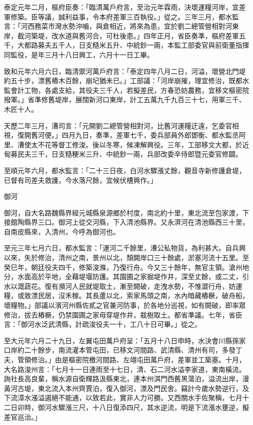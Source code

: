 \begin{pinyinscope}
 泰定元年二月，樞府臣奏：「臨清萬戶府言，至治元年霖雨，決壞運糧河岸，宜差軍修築。臣等議，誠利益事，令本府差軍三百執役。」從之。三年三月，都水監言：「河西務菜市灣水勢沖嚙，與倉相近，將來為患，宜於劉二總管營相對河東岸，截河築堤，改水道與舊河合，可杜後患。」四年正月，省臣奏準，樞府差軍五千，大都路募夫五千人，日支糙米五升、中統鈔一兩，本監工部委官與前衛董指揮同監役，是年三月十八日興工，六月十一日工畢。



 致和元年六月六日，臨清禦河萬戶府言：「泰定四年八月二日，河溢，壞營北門堤約五十步，漂舊樁木百餘，崩圮猶未已。」工部議：「河岸崩摧，理宜修治，既都水監會計工物，各處支給，其役夫三千人，若擬差民，方春恐妨農務，宜移文樞密院撥軍。」省準修舊堤岸，展闊新河口東岸，計工五萬九千九百三十七，用軍三千、木匠十人。



 天歷二年三月，漕司言：「元開劉二總管營相對河，比舊河運糧迂遠，乞委官相視，復開舊河便。」四月九日，奏準，差軍七千，委兵部員外郎鄧衡、都水監丞阿里、漕使太不花等督工修浚。後以冬寒，候凍解興役。三年，工部移文大都，於近甸募民夫三千，日支糙粳米三升、中統鈔一兩，兵部改委辛侍郎暨元委官修闢。



 至順元年六月，都水監言：「二十三日夜，白河水驟漲丈餘，觀音寺新修護倉堤，已督有司差夫救護，今水落尺餘，宜候伏槽興作。」



 御河



 御河，自大名路魏縣界經元城縣泉源鄉於村度，南北約十里，東北流至包家渡，下接館陶縣界三口。御河上從交河縣，下入清池縣界。又永濟河在清池縣西三十里，自南皮縣來，入清州，今呼為御河也。



 至元三年七月六日，都水監言：「運河二千餘里，漕公私物貨，為利甚大。自兵興以來，失於修治，清州之南，景州以北，頹闕岸口三十餘處，淤塞河流十五里。至癸巳年，朝廷役夫四千，修築浚滌，乃復行舟。今又三十餘年，無官主領。滄州地分，水面高於平地，全藉堤堰防護。其園圃之家掘堤作井，深至丈餘，或二丈，引水以溉蔬花。復有瀕河人民就堤取土，漸至闕破，走洩水勢，不惟澀行舟，妨運糧，或致漂民居，沒禾稼。其長蘆以北，索家馬頭之南，水內暗藏樁橛，破舟船，壞糧物。」部議以濱河州縣佐貳之官兼河防事，於各地分巡視，如有闕破，即率眾修治，拔去樁橛，仍禁園圃之家毋穿堤作井，栽樹取土。都省準議。七年，省臣言：「御河水泛武清縣，計疏浚役夫一十，工八十日可畢。」從之。



 至大元年六月二十九日，左翼屯田萬戶府呈：「五月十八日申時，水決會川縣孫家口岸約二十餘步，南流灌本管屯田，已移文河間路、武清縣、清州有司，多發丁夫，管領修治。」由是樞密院檄河間路、左翊屯田萬戶府，差軍並工築塞。十月，大名路浚州言：「七月十一日連雨至十七日，清、石二河水溢李家道，東南橫流。詢社長高良輩，稱水源自衛輝路汲縣東北，連本州淇門西舊黑蕩泊，溢流出岸，漫黃河古堤，東北流入本州齊賈泊，復入御河，漂及門民舍。竊計今歲水勢逆行，及下流漳水漲溢遏絕不能通，以致若此，實非人力可勝。又西關水手佐聚稱，七月十二日卯時，御河水驟漲三尺，十八日復添四尺，其水逆流，明是下流漲水壅逆，擬差官巡治。」




\end{pinyinscope}
